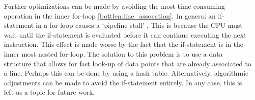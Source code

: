Further optimizations can be made by avoiding the most time consuming operation in the inner for-loop \ref{bottlen:line_assocation}. In general an if-statement in a for-loop causes a `pipeline stall' \cite[lecture 7, "Pipeline stall", slide 19]{scientific_programming}. This is because the CPU must wait until the if-statement is evaluated before it can continue executing the next instruction. This effect is made worse by the fact that the if-statement is in the inner most nested for-loop. The solution to this problem is to use a data structure that allows for fast look-up of data points that are already associated to a line. Perhaps this can be done by using a hash table. Alternatively, algorithmic adjustments can be made to avoid the if-statement entirely. In any case, this is left as a topic for future work.